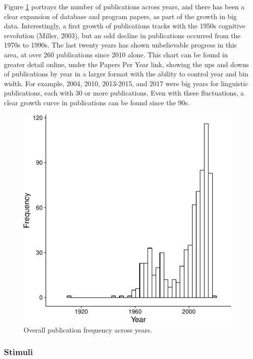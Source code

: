 \documentclass[english,man]{apa6}
\theoremstyle{definition}
\theoremstyle{definition}
\theoremstyle{definition}
\theoremstyle{remark}
\begin{document}
Figure \ref{fig:pub-fig} portrays the number of publications across
years, and there has been a clear expansion of database and program
papers, as part of the growth in big data. Interestingly, a first growth
of publications tracks with the 1950s cognitive revolution (Miller,
2003), but an odd decline in publications occurred from the 1970s to
1990s. The last twenty years has shown unbelievable progress in this
area, at over 260 publications since 2010 alone. This chart can be found
in greater detail online, under the Papers Per Year link, showing the
ups and downs of publications by year in a larger format with the
ability to control year and bin width. For example, 2004, 2010,
2013-2015, and 2017 were big years for linguistic publications, each
with 30 or more publications. Even with these fluctuations, a clear
growth curve in publications can be found since the 90s.

\begin{figure}
\centering
\includegraphics{LAB_files/figure-latex/pub-fig-1.pdf}
\caption{\label{fig:pub-fig}Overall publication frequency across years.}
\end{figure}

\subsubsection{Stimuli}\label{stimuli}
\end{document}
